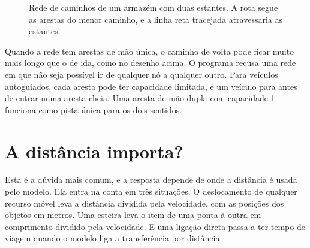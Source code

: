 \begin{figure}[ht]
\centering
{}
\caption{Rede de caminhos de um armazém com duas estantes. A rota segue as arestas do menor caminho, e a linha reta tracejada atravessaria as estantes.}
\label{fig-rede}
\end{figure}

Quando a rede tem arestas de mão única, o caminho de volta pode ficar muito mais longo que o de ida, como no desenho acima. O programa recusa uma rede em que não seja possível ir de qualquer nó a qualquer outro. Para veículos autoguiados, cada aresta pode ter capacidade limitada, e um veículo para antes de entrar numa aresta cheia. Uma aresta de mão dupla com capacidade 1 funciona como pista única para os dois sentidos.

\section{A distância importa?}

Esta é a dúvida mais comum, e a resposta depende de onde a distância é usada pelo modelo. Ela entra na conta em três situações. O deslocamento de qualquer recurso móvel leva a distância dividida pela velocidade, com as posições dos objetos em metros. Uma esteira leva o item de uma ponta à outra em comprimento dividido pela velocidade. E uma ligação direta passa a ter tempo de viagem quando o modelo liga a transferência por distância.


